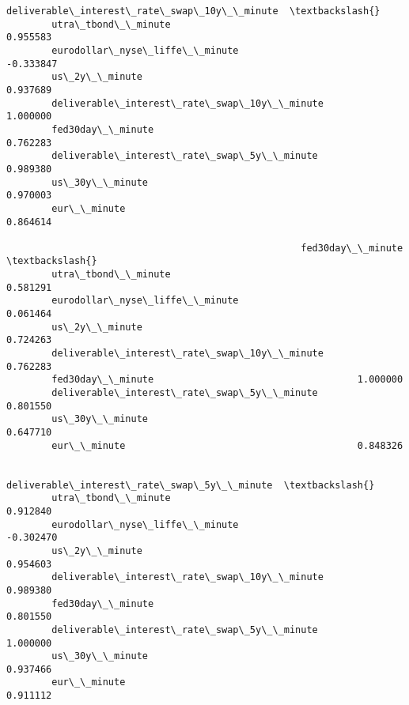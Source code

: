 \documentclass[11pt]{article}
\begin{document}
\begin{Verbatim}[commandchars=\\\{\}]
                                                    deliverable\_interest\_rate\_swap\_10y\_\_minute  \textbackslash{}
        utra\_tbond\_\_minute                                                            0.955583   
        eurodollar\_nyse\_liffe\_\_minute                                                -0.333847   
        us\_2y\_\_minute                                                                 0.937689   
        deliverable\_interest\_rate\_swap\_10y\_\_minute                                    1.000000   
        fed30day\_\_minute                                                              0.762283   
        deliverable\_interest\_rate\_swap\_5y\_\_minute                                     0.989380   
        us\_30y\_\_minute                                                                0.970003   
        eur\_\_minute                                                                   0.864614   
        
                                                    fed30day\_\_minute  \textbackslash{}
        utra\_tbond\_\_minute                                  0.581291   
        eurodollar\_nyse\_liffe\_\_minute                       0.061464   
        us\_2y\_\_minute                                       0.724263   
        deliverable\_interest\_rate\_swap\_10y\_\_minute          0.762283   
        fed30day\_\_minute                                    1.000000   
        deliverable\_interest\_rate\_swap\_5y\_\_minute           0.801550   
        us\_30y\_\_minute                                      0.647710   
        eur\_\_minute                                         0.848326   
        
                                                    deliverable\_interest\_rate\_swap\_5y\_\_minute  \textbackslash{}
        utra\_tbond\_\_minute                                                           0.912840   
        eurodollar\_nyse\_liffe\_\_minute                                               -0.302470   
        us\_2y\_\_minute                                                                0.954603   
        deliverable\_interest\_rate\_swap\_10y\_\_minute                                   0.989380   
        fed30day\_\_minute                                                             0.801550   
        deliverable\_interest\_rate\_swap\_5y\_\_minute                                    1.000000   
        us\_30y\_\_minute                                                               0.937466   
        eur\_\_minute                                                                  0.911112   
        

\end{Verbatim}
\end{document}
